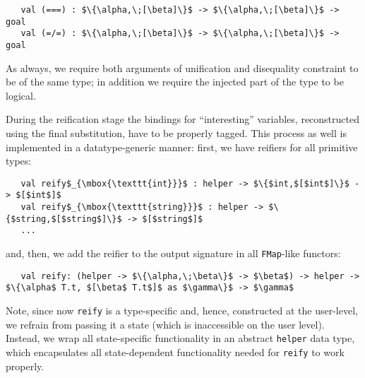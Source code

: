 \begin{lstlisting}
   val (===) : $\{\alpha,\;[\beta]\}$ -> $\{\alpha,\;[\beta]\}$ -> goal
   val (=/=) : $\{\alpha,\;[\beta]\}$ -> $\{\alpha,\;[\beta]\}$ -> goal
\end{lstlisting}

As always, we require both arguments of unification and disequality constraint to be of the same type; in addition
we require the injected part of the type to be logical.

During the reification stage the bindings for ``interesting'' variables, reconstructed using the final
substitution, have to be properly tagged. This process as well is implemented in a datatype-generic manner:
first, we have reifiers for all primitive types:

\begin{lstlisting}
   val reify$_{\mbox{\texttt{int}}}$ : helper -> $\{$int,$[$int$]\}$ -> $[$int$]$
   val reify$_{\mbox{\texttt{string}}}$ : helper -> $\{$string,$[$string$]\}$ -> $[$string$]$
   ...
\end{lstlisting}

and, then, we add the reifier to the output signature in all \lstinline{FMap}-like functors:

\begin{lstlisting}
   val reify: (helper -> $\{\alpha,\;\beta\}$ -> $\beta$) -> helper -> $\{\alpha$ T.t, $[\beta$ T.t$]$ as $\gamma\}$ -> $\gamma$
\end{lstlisting}

Note, since now \lstinline{reify} is a type-specific and, hence, constructed at the user-level, we refrain from passing
it a state (which is inaccessible on the user level). Instead, we wrap all state-specific functionality in
an abstract \lstinline{helper} data type, which encapsulates all state-dependent functionality needed for \lstinline{reify}
to work properly.
